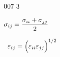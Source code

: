 \begin{mitframe}{007-3} %

    
	\begin{listone}
    
   		\item $\molecrad_{ij} = \dfrac{\molecrad_{ii}+\molecrad_{jj}}{2}$
	
    
    	\item ~$\partpoten_{ij} = \Big(\partpoten_{ii}\partpoten_{jj}\Big)^{1/2} $
    
        
	\end{listone}
 
\end{mitframe}